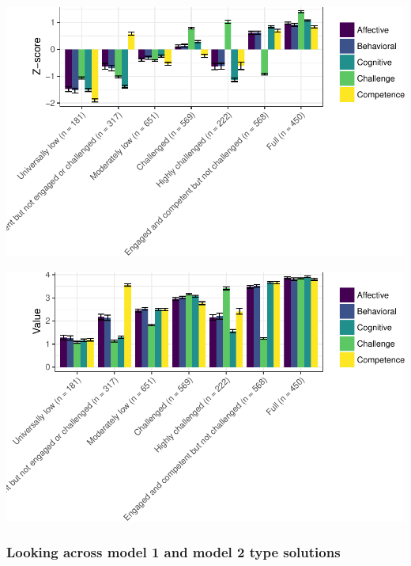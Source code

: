 \documentclass[]{msu-thesis}
\theoremstyle{definition}
\theoremstyle{definition}
\theoremstyle{definition}
\theoremstyle{remark}
\begin{document}
\begin{center}\includegraphics[width=0.8\linewidth]{rosenberg-dissertation_files/figure-latex/m1_7p-1} \end{center}

\begin{center}\includegraphics[width=0.8\linewidth]{rosenberg-dissertation_files/figure-latex/m1_7p-2} \end{center}

\subsubsection{Looking across model 1 and model 2 type
solutions}\label{looking-across-model-1-and-model-2-type-solutions}
\end{document}
